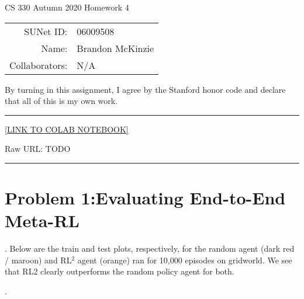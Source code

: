 \documentclass[11pt]{article}
\begin{document}
\begin{center}
	{\Large CS 330 Autumn 2020 Homework 4}
	
	\begin{tabular}{rl}
		SUNet ID: & 06009508 \\
		Name: & Brandon McKinzie \\
		Collaborators: & N/A
	\end{tabular}
\end{center}

\p By turning in this assignment, I agree by the Stanford honor code and declare
that all of this is my own work.

\rule{\linewidth}{0.4pt}

\href{TODO}{[LINK TO COLAB NOTEBOOK]}

Raw URL: TODO

\rule{\linewidth}{0.4pt}

\clearpage 
\section*{Problem 1:Evaluating End-to-End Meta-RL}

. Below are the train and test plots, respectively, for the random agent (dark red / maroon) and RL$^2$ agent (orange) ran for 10,000 episodes on gridworld. We see that RL2 clearly outperforms the random policy agent for both.



\clearpage 
{}. 
\end{document}
